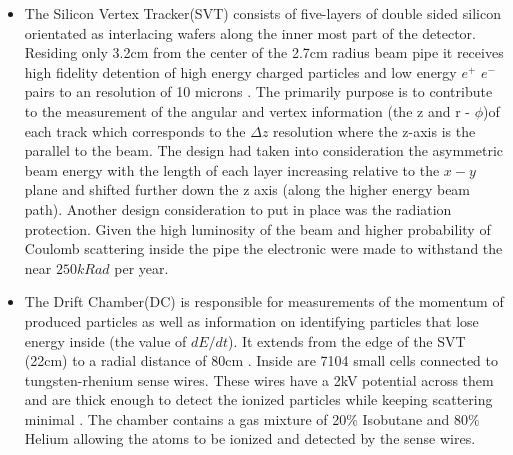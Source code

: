 \begin{itemize}
\item The Silicon Vertex Tracker(SVT) consists of five-layers of double sided silicon orientated as interlacing wafers along the inner most part of the detector. Residing only 3.2cm from the center of the 2.7cm radius beam pipe it receives  high fidelity detention of high energy charged particles and low energy $e^{+}$ $e^{-}$ pairs to an resolution of 10 microns \cite{B14}. The primarily purpose is to contribute to the measurement of the angular and vertex information (the z  and r - $\phi$)of each track which corresponds to the $\Delta z$ resolution where the z-axis is the parallel to the beam. The design had taken into consideration the asymmetric beam energy with the length of each layer increasing relative to the $x-y$ plane and shifted further down the z axis (along the higher energy beam path). Another design consideration to put in place was the radiation protection. Given the high luminosity of the beam and higher probability of Coulomb scattering inside the pipe the electronic were made to withstand the near $250kRad$ per year.




\item The Drift Chamber(DC) is responsible for measurements of the momentum of produced particles as well as information on identifying particles that lose energy inside (the value of $dE/dt$). It extends from the edge of the SVT (22cm) to a radial distance of 80cm . Inside are 7104 small cells connected to tungsten-rhenium sense wires. These wires have a 2kV potential across them and are thick enough to detect the ionized particles while keeping scattering minimal . The chamber contains a gas mixture of 20$\%$ Isobutane and 80$\%$ Helium allowing the atoms to be ionized and detected by the sense wires. \cite{B13}





\end{itemize}
